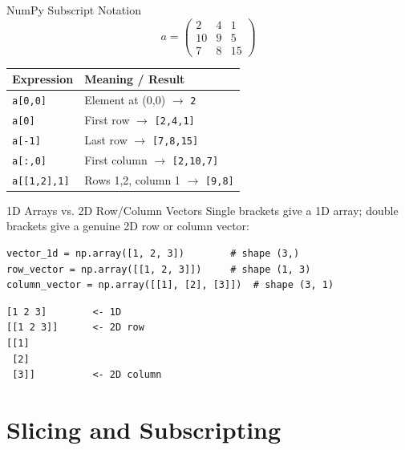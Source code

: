 \documentclass[9pt,aspectratio=169,xcolor=table]{beamer}
\newcommand{\striped}{\rowcolors{1}{white}{stripe}}
\begin{document}
\begin{frame}{NumPy Subscript Notation}
    \leavevmode
    \[
    a = \begin{pmatrix} 2 & 4 & 1 \\ 10 & 9 & 5 \\ 7 & 8 & 15 \end{pmatrix}
    \]

    \small
    \striped
    \begin{center}
    \begin{tabular}{ll}
        \toprule
        \textbf{Expression} & \textbf{Meaning / Result} \\
        \midrule
        \texttt{a[0,0]} & Element at (0,0) $\to$ \texttt{2} \\
        \texttt{a[0]} & First row $\to$ \texttt{[2,4,1]} \\
        \texttt{a[-1]} & Last row $\to$ \texttt{[7,8,15]} \\
        \texttt{a[:,0]} & First column $\to$ \texttt{[2,10,7]} \\
        \texttt{a[[1,2],1]} & Rows 1,2, column 1 $\to$ \texttt{[9,8]} \\
        \bottomrule
    \end{tabular}
    \end{center}
\end{frame}

\begin{frame}[fragile]{1D Arrays vs. 2D Row/Column Vectors}
    \leavevmode
    Single brackets give a \alert{1D array}; double brackets give a
    genuine \alert{2D} row or column vector:

\begin{lstlisting}
vector_1d = np.array([1, 2, 3])        # shape (3,)
row_vector = np.array([[1, 2, 3]])     # shape (1, 3)
column_vector = np.array([[1], [2], [3]])  # shape (3, 1)
\end{lstlisting}
\begin{lstlisting}[style=skoutput]
[1 2 3]        <- 1D
[[1 2 3]]      <- 2D row
[[1]
 [2]
 [3]]          <- 2D column
\end{lstlisting}
\end{frame}

\section{Slicing and Subscripting}
\end{document}
